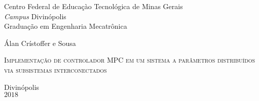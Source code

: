 

\vspace*{1.0cm}

\begin{center}
    {\textsc  Centro Federal de Educaçào Tecnológica de Minas Gerais\\
        \textit{Campus} Divinópolis\\
        Graduação em Engenharia Mecatrônica}
\end{center}

\vspace*{3.0cm}

\begin{center}
    \large Álan Crístoffer e Sousa
\end{center}

\vspace*{2.5cm}

\begin{center}
    \Large{\textsc{Implementação de controlador MPC em um sistema a parâmetros
                  distribuídos via subsistemas interconectados}} %
\end{center}

\vspace*{4cm}

\columnwidth{}
\centerline{}

\null\vfill

\begin{center}
    Divinópolis\\
    \(2018\) %
\end{center}

\thispagestyle{empty}
\cleardoublepage{}


\vspace*{1cm}

